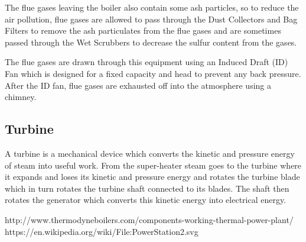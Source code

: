 \documentclass{report}
\begin{document}
The flue gases leaving the boiler also contain some ash particles, so to reduce the air pollution, flue gases are allowed to pass through the Dust Collectors and Bag Filters to remove the ash particulates from the flue gases and are sometimes passed through the Wet Scrubbers to decrease the sulfur content from the gases.

The flue gases are drawn through this equipment using an Induced Draft (ID) Fan which is designed for a fixed capacity and head to prevent any back pressure. After the ID fan, flue gases are exhausted off into the atmosphere using a chimney.

\subsection{Turbine}
A turbine is a mechanical device which converts the kinetic and pressure energy of steam into useful work. From the super-heater steam goes to the turbine where it expands and loses its kinetic and pressure energy and rotates the turbine blade which in turn rotates the turbine shaft connected to its blades. The shaft then rotates the generator which converts this kinetic energy into electrical energy.

\begin{thebibliography}{999}
http://www.thermodyneboilers.com/components-working-thermal-power-plant/
https://en.wikipedia.org/wiki/File:PowerStation2.svg
\end{thebibliography}
\end{document}
